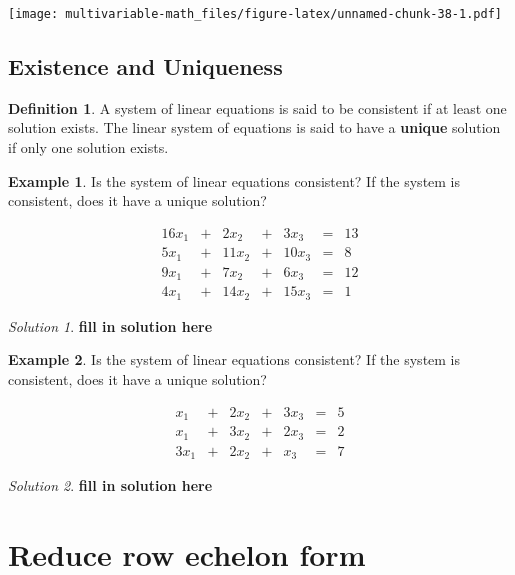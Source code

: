 \documentclass[
]{book}
\theoremstyle{definition}
\newtheorem{definition}{Definition}[chapter]
\theoremstyle{definition}
\newtheorem{example}{Example}[chapter]
\theoremstyle{definition}
\theoremstyle{definition}
\theoremstyle{remark}
\newtheorem*{solution}{Solution}
\begin{document}
\texttt{[image: multivariable-math\_files/figure-latex/unnamed-chunk-38-1.pdf]}

\hypertarget{existence-and-uniqueness}{%
\subsection{Existence and Uniqueness}\label{existence-and-uniqueness}}

\begin{definition}
A system of linear equations is said to be consistent if at least one solution exists. The linear system of equations is said to have a \textbf{unique} solution if only one solution exists.
\end{definition}

\begin{example}
Is the system of linear equations consistent? If the system is consistent, does it have a unique solution?

\[
\begin{alignedat}{4}  16 x_1 & {}+{} & 2 x_2 & {}+{} & 3 x_3 & {}={} & 13\\ 5 x_1 & {}+{} & 11 x_2 & {}+{} & 10 x_3 & {}={} & 8\\ 9 x_1 & {}+{} & 7 x_2 & {}+{} & 6 x_3 & {}={} & 12\\ 4 x_1 & {}+{} & 14 x_2 & {}+{} & 15 x_3 & {}={} & 1 \end{alignedat}
\]
\end{example}

\begin{solution}
\textbf{fill in solution here}
\end{solution}

\begin{example}
Is the system of linear equations consistent? If the system is consistent, does it have a unique solution?

\[
\begin{alignedat}{4}   x_1 & {}+{} & 2 x_2 & {}+{} & 3 x_3 & {}={} & 5\\  x_1 & {}+{} & 3 x_2 & {}+{} & 2 x_3 & {}={} & 2\\ 3 x_1 & {}+{} & 2 x_2 & {}+{} &  x_3 & {}={} & 7 \end{alignedat}
\]
\end{example}

\begin{solution}
\textbf{fill in solution here}
\end{solution}

\hypertarget{reduce-row-echelon-form}{%
\section{Reduce row echelon form}\label{reduce-row-echelon-form}}
\end{document}
